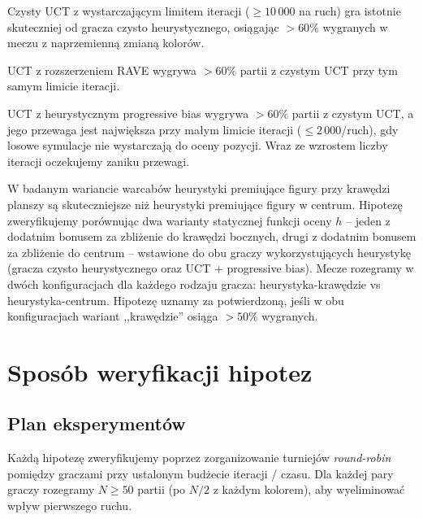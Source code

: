 \documentclass[11pt,a4paper]{article}
\begin{document}
\begin{description}[style=nextline,leftmargin=0pt]
    \item[H1 (UCT vs heurystyka).] Czysty UCT z wystarczającym
        limitem iteracji ($\geq 10\,000$ na ruch) gra istotnie
        skuteczniej od gracza czysto heurystycznego, osiągając $> 60\%$ wygranych w meczu z
        naprzemienną zmianą kolorów. 

    \item[H2 (RAVE poprawia UCT).] UCT z rozszerzeniem RAVE wygrywa
        $> 60\%$ partii z czystym UCT przy tym samym limicie 
        iteracji.

    \item[H3 (Progressive bias poprawia UCT).] UCT z heurystycznym
        progressive bias wygrywa $> 60\%$ partii z czystym UCT,
        a jego przewaga jest największa przy małym limicie 
        iteracji ($\leq 2\,000$/ruch), gdy losowe symulacje nie
        wystarczają do oceny pozycji. Wraz ze wzrostem liczby
        iteracji oczekujemy zaniku przewagi.

    \item[H4 (krawędzie vs środek planszy).] 
        W badanym wariancie warcabów heurystyki premiujące figury
        przy krawędzi planszy są skuteczniejsze niż heurystyki
        premiujące figury w centrum. Hipotezę zweryfikujemy
        porównując dwa warianty statycznej funkcji oceny $h$
        -- jeden z dodatnim bonusem za zbliżenie do krawędzi
        bocznych, drugi z dodatnim bonusem za zbliżenie do
        centrum -- wstawione do obu graczy wykorzystujących
        heurystykę (gracza czysto heurystycznego oraz UCT +
        progressive bias). Mecze rozegramy w dwóch
        konfiguracjach dla każdego rodzaju gracza: heurystyka-krawędzie vs
        heurystyka-centrum. Hipotezę
        uznamy za potwierdzoną, jeśli w obu konfiguracjach
        wariant ,,krawędzie'' osiąga $> 50\%$ wygranych.
\end{description}

\section{Sposób weryfikacji hipotez}

\subsection{Plan eksperymentów}

Każdą hipotezę zweryfikujemy poprzez zorganizowanie turniejów
\emph{round-robin} pomiędzy graczami przy ustalonym budżecie iteracji /
czasu. Dla każdej pary graczy rozegramy $N \geq 50$ partii (po
$N/2$ z każdym kolorem), aby wyeliminować wpływ pierwszego ruchu.
\end{document}
